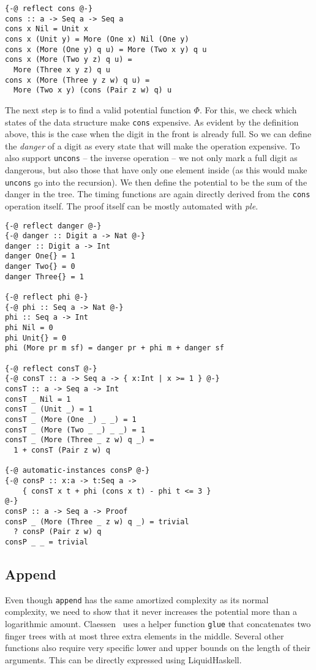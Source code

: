 \documentclass[sigplan,screen,review,anonymous]{acmart}
\begin{document}
\begin{lstlisting}
{-@ reflect cons @-}
cons :: a -> Seq a -> Seq a
cons x Nil = Unit x
cons x (Unit y) = More (One x) Nil (One y)
cons x (More (One y) q u) = More (Two x y) q u
cons x (More (Two y z) q u) =
  More (Three x y z) q u
cons x (More (Three y z w) q u) =
  More (Two x y) (cons (Pair z w) q) u
\end{lstlisting}

The next step is to find a valid potential function $\Phi$. For this, we check which states of the data structure make \texttt{cons} expensive. As evident by the definition above, this is the case when the digit in the front is already full. So we can define the \textit{danger} of a digit as every state that will make the operation expensive. To also support \texttt{uncons} -- the inverse operation -- we not only mark a full digit as dangerous, but also those that have only one element inside (as this would make \texttt{uncons} go into the recursion). We then define the potential to be the sum of the danger in the tree. The timing functions are again directly derived from the \texttt{cons} operation itself. The proof itself can be mostly automated with \textit{ple}.

\begin{lstlisting}
{-@ reflect danger @-}
{-@ danger :: Digit a -> Nat @-}
danger :: Digit a -> Int
danger One{} = 1
danger Two{} = 0
danger Three{} = 1

{-@ reflect phi @-}
{-@ phi :: Seq a -> Nat @-}
phi :: Seq a -> Int
phi Nil = 0
phi Unit{} = 0
phi (More pr m sf) = danger pr + phi m + danger sf

{-@ reflect consT @-}
{-@ consT :: a -> Seq a -> { x:Int | x >= 1 } @-}
consT :: a -> Seq a -> Int
consT _ Nil = 1
consT _ (Unit _) = 1
consT _ (More (One _) _ _) = 1
consT _ (More (Two _ _) _ _) = 1
consT _ (More (Three _ z w) q _) =
  1 + consT (Pair z w) q

{-@ automatic-instances consP @-}
{-@ consP :: x:a -> t:Seq a ->
    { consT x t + phi (cons x t) - phi t <= 3 }
@-}
consP :: a -> Seq a -> Proof
consP _ (More (Three _ z w) q _) = trivial
  ? consP (Pair z w) q
consP _ _ = trivial
\end{lstlisting}

\subsection{Append}\label{sec:append}

Even though \texttt{append} has the same amortized complexity as its normal complexity, we need to show that it never increases the potential more than a logarithmic amount. Claessen~\cite{fingertrees_new} uses a helper function \texttt{glue} that concatenates two finger trees with at most three extra elements in the middle. Several other functions also require very specific lower and upper bounds on the length of their arguments. This can be directly expressed using LiquidHaskell.
\end{document}
